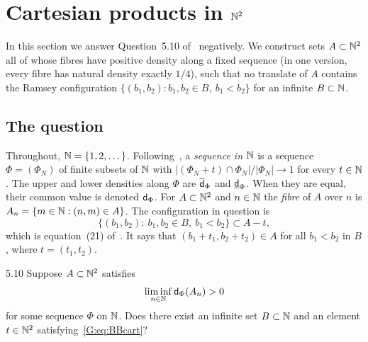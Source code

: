 
\section{Cartesian products in \texorpdfstring{$\mathbb{N}^2$}{N2}}
\label{G:sec:q510}

In this section we answer Question~5.10 of~\cite{kra2023problems} negatively. We
construct sets $A\subset\mathbb{N}^2$ all of whose fibres have positive density along a fixed
\Fol{} sequence (in one version, every fibre has natural density exactly $1/4$), such that
no translate of $A$ contains the Ramsey configuration
$\{(b_1,b_2):b_1,b_2\in B,\ b_1<b_2\}$ for an infinite $B\subset\mathbb{N}$.

\subsection{The question}
Throughout, $\mathbb{N}=\{1,2,\dots\}$. Following~\cite{kra2023problems}, a \emph{\Fol{} sequence
in $\mathbb{N}$} is a sequence $\Phi=(\Phi_N)$ of finite subsets of $\mathbb{N}$ with
$|(\Phi_N+t)\cap\Phi_N|/|\Phi_N|\to1$ for every $t\in\mathbb{N}$. The upper and lower densities
along $\Phi$ are $\overline{\mathsf{d}}_\Phi$ and $\underline{\mathsf{d}}_\Phi$. When they are equal, their common value
is denoted $\mathsf{d}_\Phi$. For $A\subset\mathbb{N}^2$ and $n\in\mathbb{N}$ the \emph{fibre} of $A$ over $n$ is
$A_n=\{m\in\mathbb{N}:(n,m)\in A\}$. The configuration in question is
\begin{equation}\label{G:eq:BBcart}
\{(b_1,b_2):\ b_1,b_2\in B,\ b_1<b_2\}\subset A-t,
\end{equation}
which is equation~(21) of~\cite{kra2023problems}. It says that
$(b_1+t_1,b_2+t_2)\in A$ for all $b_1<b_2$ in $B$, where $t=(t_1,t_2)$.

\begin{question}{5.10}\label{G:q:510}
Suppose $A\subset\mathbb{N}^2$ satisfies
\begin{equation}\label{G:eq:22}
\liminf_{n\in\mathbb{N}}\mathsf{d}_\Phi(A_n)>0
\end{equation}
for some \Fol{} sequence $\Phi$ on $\mathbb{N}$. Does there exist an infinite set $B\subset\mathbb{N}$ and
an element $t\in\mathbb{N}^2$ satisfying~\eqref{G:eq:BBcart}?
\end{question}

